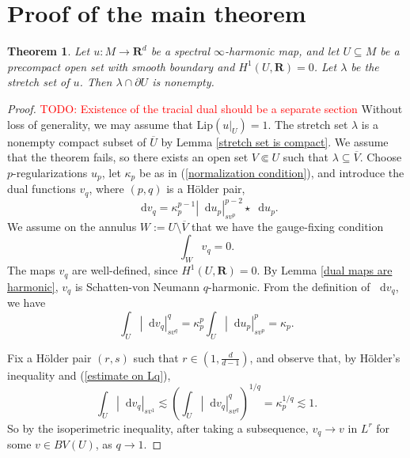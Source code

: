 \documentclass[reqno,11pt]{amsart}
\newcommand{\RR}{\mathbf{R}}
\newcommand*\dif{\mathop{}\!\mathrm{d}}
\newcommand{\Lip}{\mathrm{Lip}}
\newtheorem{theorem}{Theorem}[section]
\theoremstyle{definition}
\numberwithin{equation}{section}
\newcommand\todo[1]{\textcolor{red}{TODO: #1}}
\begin{document}
\section{Proof of the main theorem}
\begin{theorem}
Let $u: M \to \RR^d$ be a spectral $\infty$-harmonic map, and let $U \subseteq M$ be a precompact open set with smooth boundary and $H^1(U, \RR) = 0$.
Let $\lambda$ be the stretch set of $u$.
Then $\lambda \cap \partial U$ is nonempty.
\end{theorem}
\begin{proof}
\todo{Existence of the tracial dual should be a separate section}
Without loss of generality, we may assume that $\Lip(u|_U) = 1$.
The stretch set $\lambda$ is a nonempty compact subset of $\overline U$ by Lemma \ref{stretch set is compact}.
We assume that the theorem fails, so there exists an open set $V \Subset U$ such that $\lambda \subseteq \overline V$.
Choose $p$-regularizations $u_p$, let $\kappa_p$ be as in (\ref{normalization condition}), and introduce the dual functions $v_q$, where $(p, q)$ is a H\"older pair,
$$\dif v_q = \kappa_p^{p - 1} |\dif u_p|_{sv^p}^{p - 2} \star \dif u_p.$$
We assume on the annulus $W := U \setminus \overline V$ that we have the gauge-fixing condition
\begin{equation}\label{annulus average is 0}
\int_W v_q = 0.
\end{equation}
The maps $v_q$ are well-defined, since $H^1(U, \RR) = 0$.
By Lemma \ref{dual maps are harmonic}, $v_q$ is Schatten-von Neumann $q$-harmonic.
From the definition of $\dif v_q$, we have
\begin{equation}\label{estimate on Lq}
\int_U |\dif v_q|_{sv^q}^q = \kappa_p^p \int_U |\dif u_p|_{sv^p}^p = \kappa_p.
\end{equation}

Fix a H\"older pair $(r, s)$ such that $r \in (1, \frac{d}{d - 1})$, and observe that, by H\"older's inequality and (\ref{estimate on Lq}),
$$\int_U |\dif v_q|_{sv^1} \lesssim \left(\int_U |\dif v_q|_{sv^q}^q\right)^{1/q} = \kappa_p^{1/q} \lesssim 1.$$
So by the isoperimetric inequality, after taking a subsequence, $v_q \to v$ in $L^r$ for some $v \in BV(U)$, as $q \to 1$.


\end{proof}
\end{document}
